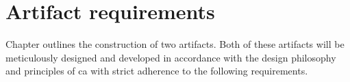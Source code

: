 \section{Artifact requirements} \label{sec_artifact_requirements}

Chapter  outlines the construction of two artifacts. Both
of these artifacts will be meticulously designed and developed in accordance with the
design philosophy and principles of \gls{ca} with strict adherence to the following
requirements.




